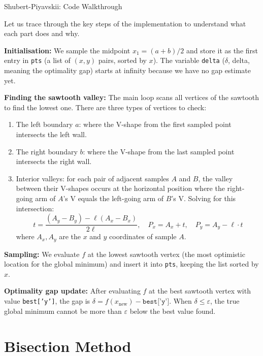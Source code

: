 \documentclass[aspectratio=169,10pt]{beamer}
\begin{document}
\begin{frame}[allowframebreaks]{Shubert-Piyavskii: Code Walkthrough}

  Let us trace through the key steps of the implementation to understand
  what each part does and why.

  \textbf{Initialisation:} We sample the midpoint $x_1 = (a+b)/2$ and store
  it as the first entry in \texttt{pts} (a list of $(x, y)$ pairs, sorted by
  $x$).  The variable \texttt{delta} ($\delta$, delta, meaning the optimality
  gap) starts at infinity because we have no gap estimate yet.

  \textbf{Finding the sawtooth valley:} The main loop scans all vertices of
  the sawtooth to find the lowest one.  There are three types of vertices to
  check:
  \begin{enumerate}
    \item The left boundary $a$: where the V-shape from the first sampled
          point intersects the left wall.
    \item The right boundary $b$: where the V-shape from the last sampled
          point intersects the right wall.
    \item Interior valleys: for each pair of adjacent samples $A$ and $B$,
          the valley between their V-shapes occurs at the horizontal position
          where the right-going arm of $A$'s V equals the left-going arm of
          $B$'s V.  Solving for this intersection:
          \[
            t = \frac{(A_y - B_y) - \ell(A_x - B_x)}{2\ell},
            \quad P_x = A_x + t, \quad P_y = A_y - \ell\cdot t
          \]
          where $A_x, A_y$ are the $x$ and $y$ coordinates of sample $A$.
  \end{enumerate}

  \textbf{Sampling:} We evaluate $f$ at the lowest sawtooth vertex (the most
  optimistic location for the global minimum) and insert it into \texttt{pts},
  keeping the list sorted by $x$.

  \textbf{Optimality gap update:} After evaluating $f$ at the best sawtooth
  vertex with value \texttt{best['y']}, the gap is $\delta = f(x_{\text{new}})
  - \texttt{best['y']}$.  When $\delta \le \varepsilon$, the true global
  minimum cannot be more than $\varepsilon$ below the best value found.

\end{frame}

\section{Bisection Method}
\end{document}
